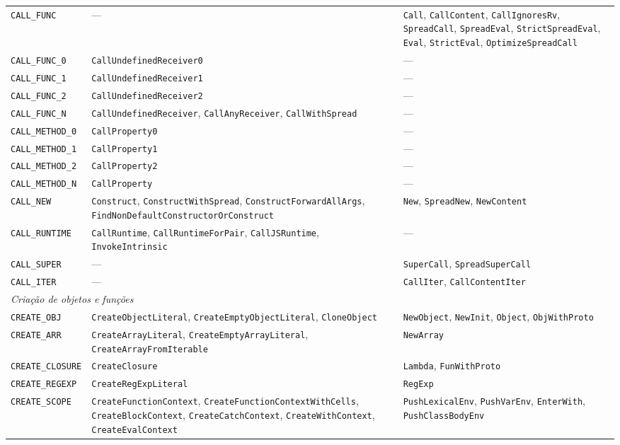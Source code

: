 {\begin{longtable}{@{}p{4.2cm}p{5.3cm}p{5.3cm}@{}}
\midrule
\texttt{CALL\_FUNC} & --- & \texttt{Call}, \texttt{CallContent}, \texttt{CallIgnoresRv}, \texttt{SpreadCall}, \texttt{SpreadEval}, \texttt{StrictSpreadEval}, \texttt{Eval}, \texttt{StrictEval}, \texttt{OptimizeSpreadCall} \\
\texttt{CALL\_FUNC\_0} & \texttt{CallUndefinedReceiver0} & --- \\
\texttt{CALL\_FUNC\_1} & \texttt{CallUndefinedReceiver1} & --- \\
\texttt{CALL\_FUNC\_2} & \texttt{CallUndefinedReceiver2} & --- \\
\texttt{CALL\_FUNC\_N} & \texttt{CallUndefinedReceiver}, \texttt{CallAnyReceiver}, \texttt{CallWithSpread} & --- \\
\texttt{CALL\_METHOD\_0} & \texttt{CallProperty0} & --- \\
\texttt{CALL\_METHOD\_1} & \texttt{CallProperty1} & --- \\
\texttt{CALL\_METHOD\_2} & \texttt{CallProperty2} & --- \\
\texttt{CALL\_METHOD\_N} & \texttt{CallProperty} & --- \\
\texttt{CALL\_NEW} & \texttt{Construct}, \texttt{ConstructWithSpread}, \texttt{ConstructForwardAllArgs}, \texttt{FindNonDefaultConstructorOrConstruct} & \texttt{New}, \texttt{SpreadNew}, \texttt{NewContent} \\
\texttt{CALL\_RUNTIME} & \texttt{CallRuntime}, \texttt{CallRuntimeForPair}, \texttt{CallJSRuntime}, \texttt{InvokeIntrinsic} & --- \\
\texttt{CALL\_SUPER} & --- & \texttt{SuperCall}, \texttt{SpreadSuperCall} \\
\texttt{CALL\_ITER} & --- & \texttt{CallIter}, \texttt{CallContentIter} \\
\midrule
\multicolumn{3}{l}{\textit{Criação de objetos e funções}} \\
\midrule
\texttt{CREATE\_OBJ} & \texttt{CreateObjectLiteral}, \texttt{CreateEmptyObjectLiteral}, \texttt{CloneObject} & \texttt{NewObject}, \texttt{NewInit}, \texttt{Object}, \texttt{ObjWithProto} \\
\texttt{CREATE\_ARR} & \texttt{CreateArrayLiteral}, \texttt{CreateEmptyArrayLiteral}, \texttt{CreateArrayFromIterable} & \texttt{NewArray} \\
\texttt{CREATE\_CLOSURE} & \texttt{CreateClosure} & \texttt{Lambda}, \texttt{FunWithProto} \\
\texttt{CREATE\_REGEXP} & \texttt{CreateRegExpLiteral} & \texttt{RegExp} \\
\texttt{CREATE\_SCOPE} & \texttt{CreateFunctionContext}, \texttt{CreateFunctionContextWithCells}, \texttt{CreateBlockContext}, \texttt{CreateCatchContext}, \texttt{CreateWithContext}, \texttt{CreateEvalContext} & \texttt{PushLexicalEnv}, \texttt{PushVarEnv}, \texttt{EnterWith}, \texttt{PushClassBodyEnv} \\

\end{longtable}}
